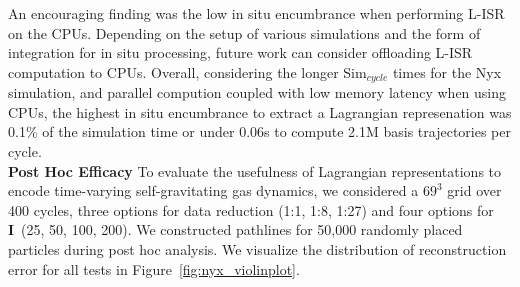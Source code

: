 An encouraging finding was the low in situ encumbrance when performing L-ISR on the CPUs.
%
Depending on the setup of various simulations and the form of integration for in situ processing, future work can consider offloading L-ISR computation to CPUs.
%
Overall, considering the longer Sim$_{cycle}$ times for the Nyx simulation, and parallel compution coupled with low memory latency when using CPUs, the highest in situ encumbrance to extract a Lagrangian represenation was 0.1\% of the simulation time or under 0.06s to compute 2.1M basis trajectories per cycle.\\




\noindent\textbf{Post Hoc Efficacy}
To evaluate the usefulness of Lagrangian representations to encode time-varying self-gravitating gas dynamics, we considered a $69^{3}$ grid over 400 cycles, three options for data reduction (1:1, 1:8, 1:27) and four options for \textbf{I}~(25, 50, 100, 200).
%
We constructed pathlines for 50,000 randomly placed particles during post hoc analysis.
%
%
%
We visualize the distribution of reconstruction error for all tests in Figure~\ref{fig:nyx_violinplot}.
%

